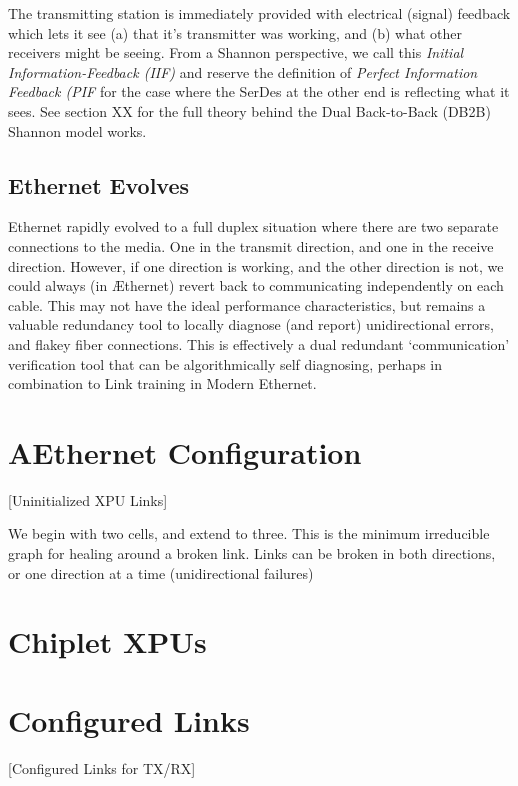 \documentclass[../../../OAE-SPEC-MAIN.tex]{subfiles}
\begin{document}
The transmitting station is immediately provided with electrical (signal) feedback which lets it see (a) that it's transmitter  was working, and (b) what other receivers might be seeing. From a Shannon perspective, we call this \emph{Initial Information-Feedback (IIF)} and reserve the definition of \emph{Perfect Information Feedback (PIF} for the case where the SerDes at the other end is reflecting what it sees.  See section XX for the full theory behind the Dual Back-to-Back (DB2B) Shannon model works.

\subsection{Ethernet Evolves}

Ethernet rapidly evolved to a full duplex situation where there are two separate connections to the media.  One in the transmit direction, and one in the receive direction. However, if one direction is working, and the other direction is not, we could always (in Æthernet) revert back to communicating independently on each cable.  This may not have the ideal performance characteristics, but remains a valuable redundancy tool to locally diagnose (and report) unidirectional errors, and flakey fiber connections. This is effectively a dual redundant `communication' verification tool that can be algorithmically self diagnosing, perhaps in combination to Link training in Modern Ethernet. 

\section{AEthernet Configuration}

[Uninitialized XPU Links]


We begin with two cells, and extend to three. This is the minimum irreducible graph for healing around a broken link. Links can be broken in both directions, or one direction at a time (unidirectional failures) 

\section{Chiplet XPUs}
\section{Configured Links}
[Configured Links for TX/RX]
\end{document}
